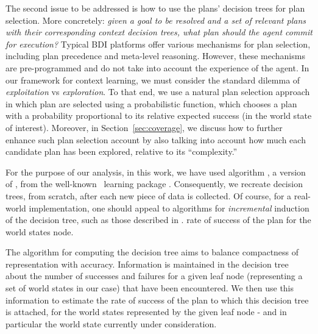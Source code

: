 The second issue to be addressed is how to use the plans' decision trees for plan
selection. More concretely: \emph{given a goal to be resolved and a set of
relevant plans with their corresponding context decision trees, what plan should
the agent commit for execution?}
Typical BDI platforms offer various mechanisms for plan selection, including plan
precedence and meta-level reasoning. However, these mechanisms are pre-programmed
and do not take into account the experience of the agent.
In our framework for context learning, we must consider the standard dilemma of
\emph{exploitation} vs \emph{exploration}. To that end, we use a natural plan
selection approach in which plan are selected using a probabilistic function,
which chooses a plan with a probability proportional to its relative expected
success (in the world state of interest). Moreover, in
Section~\ref{sec:coverage}, we discuss how to further enhance such plan selection
account by also talking into account how much each candidate plan has been
explored, relative to its ``complexity.''



For the purpose of our analysis, in this work, we have used algorithm
, a version of  \cite{Mitchell97:ML}, from the
well-known \weka\ learning package \cite{weka99}. Consequently, we
recreate decision trees, from scratch, after each new piece of data is collected.
Of course, for a real-world implementation, one should appeal to algorithms for
\emph{incremental} induction of the decision tree, such as those described in
\cite{Swere06:Fast,Utgoff97Decision}.
rate of success of the plan for the world states
node.
 
%

The algorithm for computing the decision tree aims to balance
compactness of representation with accuracy. Information
is maintained in the decision tree about the number of successes and
failures for a given leaf node (representing a set of world states in
our case) that have been encountered.
We then use this information to estimate the rate of success of the
plan to which this decision tree is attached, for the world states
represented by the given leaf node - and in particular the world state
currently under consideration.


